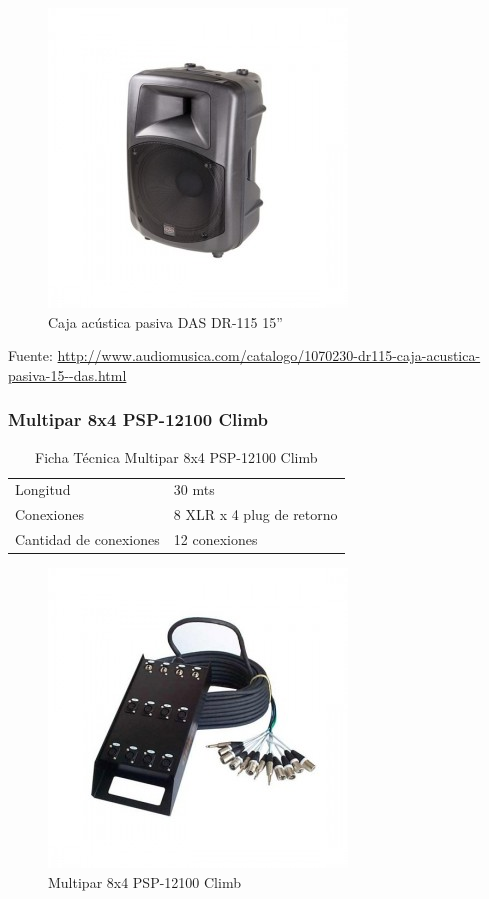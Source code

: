 \begin{figure}[h!t]
   \centering
  \includegraphics[scale=0.3]{img/caja-acustica.jpg}
   \caption{Caja acústica pasiva DAS DR-115 15''}
   \label{fig:cajaacustica}
\end{figure}
Fuente: \url{http://www.audiomusica.com/catalogo/1070230-dr115-caja-acustica-pasiva-15--das.html}

\newpage
\subsubsection*{Multipar 8x4 PSP-12100 Climb}

\begin{table}[htb!]
\centering
\begin{tabular}{|l|l|}
\hline
Longitud & 30 mts\\
Conexiones & 8 XLR x 4 plug de retorno \\
Cantidad de conexiones & 12 conexiones \\
\hline
\end{tabular}
\caption{Ficha Técnica Multipar 8x4 PSP-12100 Climb}
\end{table}

\begin{figure}[h!t]
   \centering
  \includegraphics[scale=0.3]{img/multipar.jpg}
   \caption{Multipar 8x4 PSP-12100 Climb}
   \label{fig:multipar}
\end{figure}

